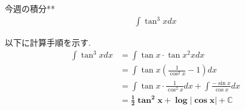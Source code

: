 \documentclass[main]{subfiles}
\begin{document}

\begin{mondai}{1}{今週の積分}{**}
    \begin{align*}
        \int \tan ^3 x dx
    \end{align*}
\end{mondai}


\solutionhead
\hfill
以下に計算手順を示す.
\hfill\ 
\begin{align*}
    \int \tan ^3 x dx   
        &= \int \tan x \cdot \tan x ^2 x dx \\
        &= \int \tan x \left( \frac{1}{\cos ^2 x} -1 \right)  dx \\
        &= \int \tan x \cdot \frac{1}{\cos ^2 x} dx + \int \frac{-\sin x}{\cos x} dx \\
        &= \boldsymbol{\frac{1}{2} \tan ^2 x + \log \left| \cos x \right| + \mathbb{C}}
\end{align*}
\end{document}
